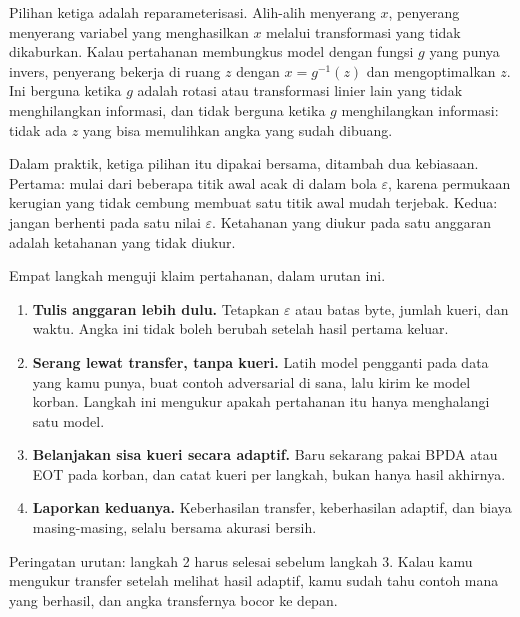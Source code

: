 Pilihan ketiga adalah reparameterisasi. Alih-alih menyerang $x$, penyerang menyerang
variabel yang menghasilkan $x$ melalui transformasi yang tidak dikaburkan. Kalau
pertahanan membungkus model dengan fungsi $g$ yang punya invers, penyerang bekerja di
ruang $z$ dengan $x=g^{-1}(z)$ dan mengoptimalkan $z$. Ini berguna ketika $g$ adalah
rotasi atau transformasi linier lain yang tidak menghilangkan informasi, dan tidak
berguna ketika $g$ menghilangkan informasi: tidak ada $z$ yang bisa memulihkan angka
yang sudah dibuang.

Dalam praktik, ketiga pilihan itu dipakai bersama, ditambah dua kebiasaan. Pertama: mulai
dari beberapa titik awal acak di dalam bola $\varepsilon$, karena permukaan kerugian yang
tidak cembung membuat satu titik awal mudah terjebak. Kedua: jangan berhenti pada satu
nilai $\varepsilon$. Ketahanan yang diukur pada satu anggaran adalah ketahanan yang tidak
diukur.

\begin{resep}
Empat langkah menguji klaim pertahanan, dalam urutan ini.
\begin{enumerate}
  \item \textbf{Tulis anggaran lebih dulu.} Tetapkan $\varepsilon$ atau batas byte,
        jumlah kueri, dan waktu. Angka ini tidak boleh berubah setelah hasil pertama
        keluar.
  \item \textbf{Serang lewat transfer, tanpa kueri.} Latih model pengganti pada data
        yang kamu punya, buat contoh adversarial di sana, lalu kirim ke model korban.
        Langkah ini mengukur apakah pertahanan itu hanya menghalangi satu model.
  \item \textbf{Belanjakan sisa kueri secara adaptif.} Baru sekarang pakai BPDA atau
        EOT pada korban, dan catat kueri per langkah, bukan hanya hasil akhirnya.
  \item \textbf{Laporkan keduanya.} Keberhasilan transfer, keberhasilan adaptif, dan
        biaya masing-masing, selalu bersama akurasi bersih.
\end{enumerate}
Peringatan urutan: langkah 2 harus selesai sebelum langkah 3. Kalau kamu mengukur
transfer setelah melihat hasil adaptif, kamu sudah tahu contoh mana yang berhasil,
dan angka transfernya bocor ke depan.
\end{resep}


